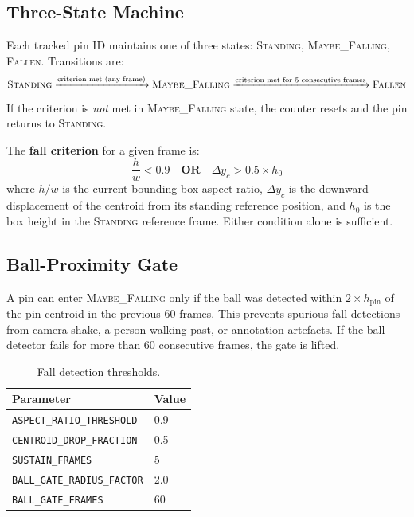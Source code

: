 \documentclass[11pt,a4paper]{article}
\begin{document}
\subsection{Three-State Machine}
\label{sec:statemachine}

Each tracked pin ID maintains one of three states: \textsc{Standing}, \textsc{Maybe\_Falling}, \textsc{Fallen}. Transitions are:
\[
\textsc{Standing}
\xrightarrow{\text{criterion met (any frame)}}
\textsc{Maybe\_Falling}
\xrightarrow{\text{criterion met for 5 consecutive frames}}
\textsc{Fallen}
\]
If the criterion is \emph{not} met in \textsc{Maybe\_Falling} state, the counter resets and the pin returns to \textsc{Standing}.

The \textbf{fall criterion} for a given frame is:
\[
\frac{h}{w} < 0.9 \quad \textbf{OR} \quad \Delta y_c > 0.5 \times h_0
\]
where $h/w$ is the current bounding-box aspect ratio, $\Delta y_c$ is the downward displacement of the centroid from its standing reference position, and $h_0$ is the box height in the \textsc{Standing} reference frame. Either condition alone is sufficient.

\subsection{Ball-Proximity Gate}
\label{sec:gate}

A pin can enter \textsc{Maybe\_Falling} only if the ball was detected within $2 \times h_{\mathrm{pin}}$ of the pin centroid in the previous 60 frames. This prevents spurious fall detections from camera shake, a person walking past, or annotation artefacts. If the ball detector fails for more than 60 consecutive frames, the gate is lifted.

\begin{table}[H]
\centering
\caption{Fall detection thresholds.}
\label{tab:thresholds}
\begin{tabular}{ll}
\toprule
Parameter & Value \\
\midrule
\texttt{ASPECT\_RATIO\_THRESHOLD}    & 0.9 \\
\texttt{CENTROID\_DROP\_FRACTION}    & 0.5 \\
\texttt{SUSTAIN\_FRAMES}             & 5   \\
\texttt{BALL\_GATE\_RADIUS\_FACTOR}  & 2.0 \\
\texttt{BALL\_GATE\_FRAMES}          & 60  \\
\bottomrule
\end{tabular}
\end{table}
\end{document}
